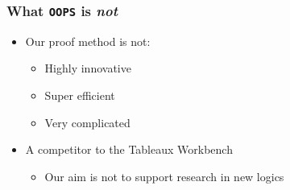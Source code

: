\documentclass{beamer}
\begin{document}
\begin{frame}
\frametitle{What {\tt OOPS} is {\em not}}
\begin{itemize}
\item Our proof method is not:
	\begin{itemize}
	\item Highly innovative
	\item Super efficient
	\item Very complicated
	\end{itemize}
\item A competitor to the Tableaux Workbench
	\begin{itemize}
	\item Our aim is not to support research in new logics
	\end{itemize}
\end{itemize}
\end{frame}
\end{document}
